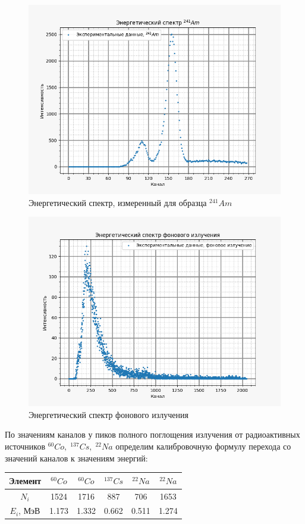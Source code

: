     \begin{figure}[H]
        \centering
        \includegraphics[width = 12 cm]{images/Am241}
        \caption{Энергетический спектр, измеренный для образца $^{241}Am$}
        \label{Am241_pic}
    \end{figure}

    \begin{figure}[H]
        \centering
        \includegraphics[width = 12 cm]{images/background}
        \caption{Энергетический спектр фонового излучения}
        \label{back_pic}
    \end{figure}

    По значениям каналов у пиков полного поглощения излучения от радиоактивных источников $^{60}Co, \; ^{137}Cs, \; ^{22}Na$ определим калибровочную формулу перехода со значений каналов к значениям энергий:

    \begin{table}[H]
        \centering
        \begin{tabular}{|c|c|c|c|c|c|}
        \hline
        Элемент  & $^{60}Co$ & $^{60}Co$ & $^{137}Cs$ & $^{22}Na$ & $^{22}Na$ \\ \hline
        $N_i$      & 1524      & 1716      & 887       & 706       & 1653    \\ \hline
        $E_i$, МэВ & 1.173     & 1.332     & 0.662     & 0.511     & 1.274   \\ \hline
        \end{tabular}
    \end{table}

